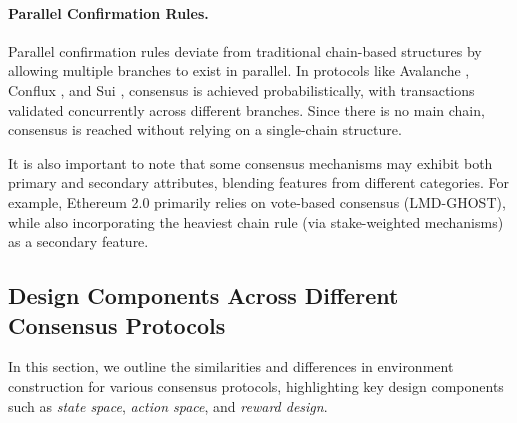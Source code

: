 \paragraph{Parallel Confirmation Rules.} Parallel confirmation rules deviate from traditional chain-based structures by allowing multiple branches to exist in parallel. 
In protocols like Avalanche \cite{rocket2019scalable}, Conflux \cite{li2020decentralized}, and Sui \cite{blackshear2023sui}, consensus is achieved probabilistically, with transactions validated concurrently across different branches. 
Since there is no main chain, consensus is reached without relying on a single-chain structure. 

It is also important to note that some consensus mechanisms may exhibit both primary and secondary attributes, blending features from different categories. 
For example, Ethereum 2.0 \cite{buterin2020combining} primarily relies on vote-based consensus (LMD-GHOST), while also incorporating the heaviest chain rule (via stake-weighted mechanisms) as a secondary feature.

\subsection{Design Components Across Different Consensus Protocols}

In this section, we outline the similarities and differences in environment construction for various consensus protocols, highlighting key design components such as \textit{state space}, \textit{action space}, and \textit{reward design}.

